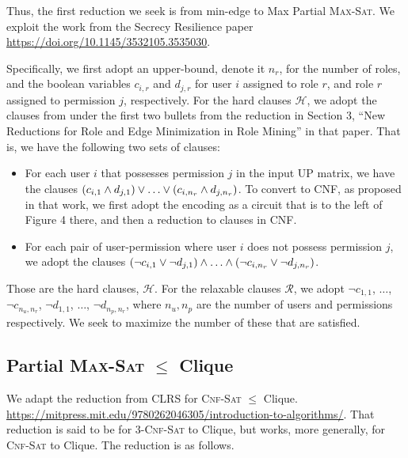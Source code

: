 \documentclass[11pt,onecolumn]{article}
\let\originalleft\left
\let\originalright\right
\renewcommand{\left}{\mathopen{}\mathclose\bgroup\originalleft}
\renewcommand{\right}{\aftergroup\egroup\originalright}
\begin{document}
\vspace*{0.125in}
\noindent
Thus, the first reduction we seek is from min-edge to Max Partial \textsc{Max-Sat}. We exploit the work from the Secrecy Resilience paper \url{https://doi.org/10.1145/3532105.3535030}.

\vspace*{0.125in}
\noindent
Specifically, we first adopt an upper-bound, denote it $n_r$, for the number of roles, and the boolean variables $c_{i,r}$ and $d_{j,r}$ for user $i$ assigned to role $r$, and role $r$ assigned to permission $j$, respectively. For the hard clauses $\mathcal{H}$, we adopt the clauses from under the first two bullets from the reduction in Section 3, ``New Reductions for Role and Edge Minimization in Role Mining'' in that paper. That is, we have the following two sets of clauses:
\begin{itemize}
\item For each user $i$ that possesses permission $j$ in the input UP matrix, we have the clauses $\left(c_{i,1}\wedge d_{j,1}\right) \vee \ldots \vee \left(c_{i,n_r} \wedge d_{j,n_r}\right)$. To convert to CNF, as proposed in that work, we first adopt the encoding as a circuit that is to the left of Figure 4 there, and then a reduction to clauses in CNF.
\item For each pair of user-permission where user $i$ does not possess permission $j$, we adopt the clauses $\left(\neg c_{i,1}\vee \neg d_{j,1}\right)\wedge\ldots\wedge\left(\neg c_{i,n_r}\vee \neg d_{j,n_r}\right)$.
\end{itemize}

\vspace*{0.125in}
\noindent
Those are the hard clauses, $\mathcal{H}$. For the relaxable clauses $\mathcal{R}$, we adopt $\neg c_{1,1}$, $\ldots$, $\neg c_{n_u, n_r}$, $\neg d_{1,1}$, $\ldots$, $\neg d_{n_p, n_r}$, where $n_u, n_p$ are the number of users and permissions respectively. We seek to maximize the number of these that are satisfied.

\subsection*{Partial \textsc{Max-Sat} $\le$ Clique}

\vspace*{0.125in}
\noindent
We adapt the reduction from CLRS for \textsc{Cnf-Sat} $\le$ Clique. \url{https://mitpress.mit.edu/9780262046305/introduction-to-algorithms/}. That reduction is said to be for 3-\textsc{Cnf-Sat} to Clique, but works, more generally, for \textsc{Cnf-Sat} to Clique. The reduction is as follows.
\end{document}
